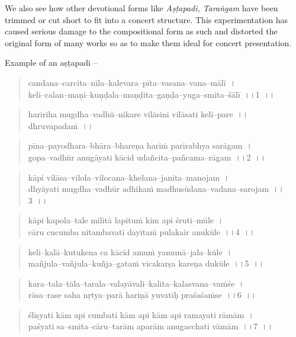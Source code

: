 We also see how other devotional forms like \textit{Aṣṭapadi, Taraṅgam} have been trimmed or cut short to fit into a concert structure. This experimentation has caused serious damage to the compositional form as such and distorted the original form of many works so as to make them ideal for concert presentation.

Example of an aṣṭapadi –

\begin{verse}
candana–carcita–nīla–kalevara–pīta–vasana–vana–mālī~।\\ keli–calan–maṇi–kuṇḍala–maṇḍita–gaṇḍa–yuga–smita–śālī~।।1~।।
\end{verse}

\begin{verse}
haririha mugdha–vadhū–nikare vilāsini vilāsati kelī–pare~।।dhruvapadaṁ~।।
\end{verse}

\begin{verse}
pīna–payodhara–bhāra–bhareṇa hariṁ parirabhya sarāgam~।\\ gopa–vadhūr anugāyati kācid udañcita–pañcama–rāgam~।।2~।।
\end{verse}

\begin{verse}
kāpi vilāsa–vilola–vilocana–khelana–janita–manojam~।\\ dhyāyati mugdha–vadhūr adhikaṁ madhusūdana–vadana–sarojam~।।3~।।
\end{verse}

\begin{verse}
kāpi kapola–tale militā lapituṁ kim api śruti–mūle~।\\ cāru cucumba nitambavatī dayitaṁ pulakair anukūle~।।4~।।
\end{verse}

\begin{verse}
keli–kalā–kutukena ca kācid amuṁ yamunā–jala–kūle~।\\ mañjula–vañjula–kuñja–gataṁ vicakarṣa kareṇa dukūle~।।5~।।
\end{verse}

\begin{verse}
kara–tala–tāla–tarala–valayāvali–kalita–kalasvana–vaṁśe~।\\ rāsa–rase saha nṛtya–parā hariṇā yuvatiḥ praśaśaṁse~।।6~।।
\end{verse}

\begin{verse}
śliṣyati kām api cumbati kām api kām api ramayati rāmām~।\\ paśyati sa–smita–cāru–tarām aparām anugacchati vāmām~।।7~।।
\end{verse}

